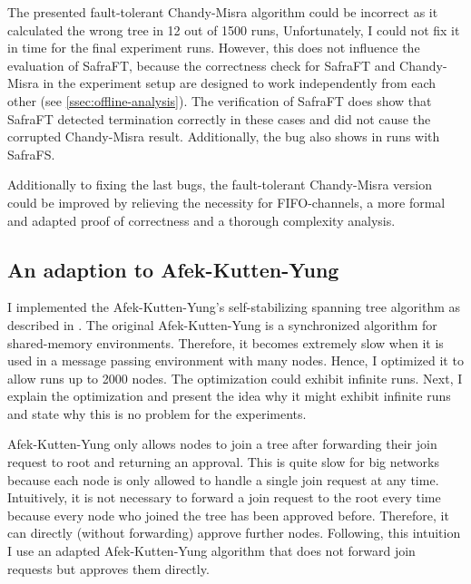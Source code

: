 The presented fault-tolerant Chandy-Misra algorithm could be incorrect as it calculated the wrong tree in 12 out of 1500 runs,
Unfortunately, I could not fix it in time for the final experiment runs.
However, this does not influence the evaluation of SafraFT, because the correctness check for SafraFT and Chandy-Misra in the experiment setup are designed to work independently from each other (see \cref{ssec:offline-analysis}).
The verification of SafraFT does show that SafraFT detected termination correctly in these cases and did not cause the corrupted Chandy-Misra result.
Additionally, the bug also shows in runs with SafraFS.

Additionally to fixing the last bugs, the fault-tolerant Chandy-Misra version could be improved by relieving the necessity for FIFO-channels, a more formal and adapted proof of correctness and a thorough complexity analysis.

\subsection{An adaption to Afek-Kutten-Yung}
I implemented the Afek-Kutten-Yung's self-stabilizing spanning tree algorithm as described in \cite[page 183ff]{fokkink:2018}.
The original Afek-Kutten-Yung is a synchronized algorithm for shared-memory environments.
Therefore, it becomes extremely slow when it is used in a message passing environment with many nodes.
Hence, I optimized it to allow runs up to 2000 nodes.
The optimization could exhibit infinite runs.
Next, I explain the optimization and present the idea why it might exhibit infinite runs and state why this is no problem for the experiments.

Afek-Kutten-Yung only allows nodes to join a tree after forwarding their join request to root and returning an approval.
This is quite slow for big networks because each node is only allowed to handle a single join request at any time.
Intuitively, it is not necessary to forward a join request to the root every time because every node who joined the tree has been approved before.
Therefore, it can directly (without forwarding) approve further nodes.
Following, this intuition I use an adapted Afek-Kutten-Yung algorithm that does not forward join requests but approves them directly.

